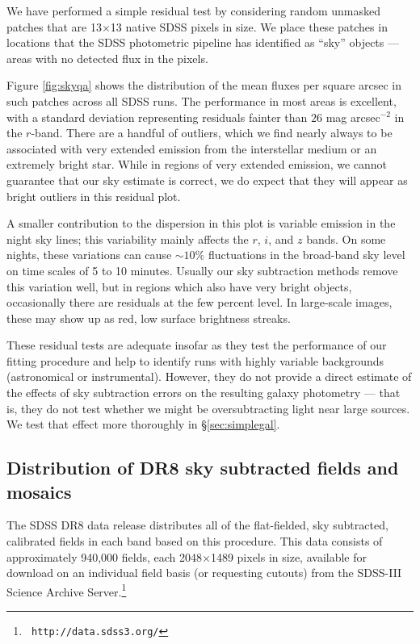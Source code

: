 \documentclass[10pt,preprint]{aastex}
\begin{document}
We have performed a simple residual test by considering random
unmasked patches that are 13$\times$13 native SDSS pixels in size. We
place these patches in locations that the SDSS photometric pipeline
has identified as ``sky'' objects --- areas with no detected flux in
the pixels.

Figure \ref{fig:skyqa} shows the distribution of the mean fluxes per
square arcsec in such patches across all SDSS runs. The performance in
most areas is excellent, with a standard deviation representing
residuals fainter than $26$ mag arcsec$^{-2}$ in the $r$-band. There
are a handful of outliers, which we find nearly always to be
associated with very extended emission from the interstellar medium or
an extremely bright star. While in regions of very extended emission,
we cannot guarantee that our sky estimate is correct, we do expect
that they will appear as bright outliers in this residual plot.

A smaller contribution to the dispersion in this plot is variable
emission in the night sky lines; this variability mainly affects the
$r$, $i$, and $z$ bands. On some nights, these variations can cause
$\sim 10\%$ fluctuations in the broad-band sky level on time scales of
5 to 10 minutes. Usually our sky subtraction methods remove this
variation well, but in regions which also have very bright objects,
occasionally there are residuals at the few percent level. In
large-scale images, these may show up as red, low surface brightness
streaks.

These residual tests are adequate insofar as they test the performance
of our fitting procedure and help to identify runs with highly
variable backgrounds (astronomical or instrumental).  However, they do
not provide a direct estimate of the effects of sky subtraction errors
on the resulting galaxy photometry --- that is, they do not test
whether we might be oversubtracting light near large sources.  We test
that effect more thoroughly in \S\ref{sec:simplegal}.

\subsection{Distribution of DR8 sky subtracted fields and mosaics}
\label{sec:fields}

The SDSS DR8 data release distributes all of the flat-fielded,
sky subtracted, calibrated fields in each band based on this
procedure. This data consists of approximately 940,000 fields, each
2048$\times$1489 pixels in size, available for download on an
individual field basis (or requesting cutouts) from the SDSS-III
Science Archive Server.\footnote{\tt
  http://data.sdss3.org/}
\end{document}
